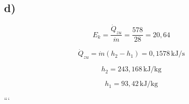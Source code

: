 

\subsection*{d)}
\[
E_k = \frac{\dot{Q}_{zu}}{\dot{m}} = \frac{578}{28} = 20{,}64
\]

\[
\dot{Q}_{zu} = \dot{m} (h_2 - h_1) = 0{,}1578 \, \text{kJ/s}
\]

\[
h_2 = 243{,}168 \, \text{kJ/kg}
\]

\[
h_1 = 93{,}42 \, \text{kJ/kg}
\]

```